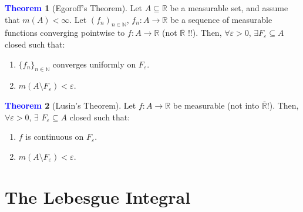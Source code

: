 \documentclass[11pt]{article}
\theoremstyle{definition}
\newcommand{\bb}[1]{\mathbb{#1}}
\newtheorem{theorem}{\textcolor{blue}{Theorem}}
\theoremstyle{definition}
\theoremstyle{remark}
\begin{document}
\begin{theorem}[Egoroff's Theorem] 
	Let $A \subseteq \bb{R}$ be a measurable set, and assume that $m(A) < \infty$. Let $(f_n)_{n \in \bb{N}}$, $f_n: A \rightarrow \bb{R}$ be a sequence of measurable functions converging pointwise to $f: A \rightarrow \bb{R}$ (not $\overline{\bb{R}}$ !!). Then, $\forall \varepsilon > 0$, $\exists F_\varepsilon \subseteq A$ closed such that: 
	\begin{enumerate}[noitemsep]
		\item $\{ f_n \}_{n \in \bb{N}}$ converges uniformly on $F_\varepsilon$. 
		\item $m(A \setminus F_\varepsilon) < \varepsilon$. 
	\end{enumerate}
\end{theorem}
\begin{theorem}[Lusin's Theorem] 
	Let $f: A \rightarrow \bb{R}$ be measurable (not into $\overline{\bb{R}}$!). Then, $\forall \varepsilon > 0$, $\exists$ $F_\varepsilon \subseteq A$ closed such that: 
	\begin{enumerate}[noitemsep]
		\item $f$ is continuous on $F_\varepsilon$. 
		\item $m(A \setminus F_\varepsilon) < \varepsilon$. 
	\end{enumerate}
\end{theorem}

\section{The Lebesgue Integral}
\end{document}
